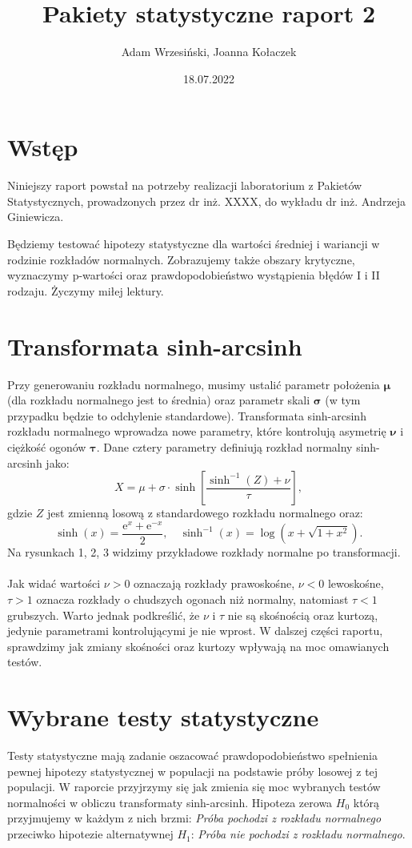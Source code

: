 \documentclass{article}
\title{Pakiety statystyczne raport 2}
\author{Adam Wrzesiński, Joanna Kołaczek}
\date{18.07.2022}
\theoremstyle{break}
\newcommand*{\e}{\mathrm{e}}
\begin{document}
	\maketitle
	\tableofcontents
	\clearpage
	\section*{Wstęp}
	
	Niniejszy raport powstał na potrzeby realizacji laboratorium z Pakietów Statystycznych, prowadzonych przez dr inż. XXXX, do wykładu dr inż. Andrzeja Giniewicza. 
	
	Będziemy testować hipotezy statystyczne dla wartości średniej i wariancji w rodzinie rozkładów normalnych. Zobrazujemy także obszary krytyczne, wyznaczymy p-wartości oraz prawdopodobieństwo wystąpienia błędów I i II rodzaju. Życzymy miłej lektury.
	
	\section*{Transformata sinh-arcsinh}
	Przy generowaniu rozkładu normalnego, musimy ustalić parametr położenia $\mathbf{\mu}$ (dla rozkładu normalnego jest to średnia) oraz parametr skali $\mathbf{\sigma}$ (w tym przypadku będzie to odchylenie standardowe). Transformata sinh-arcsinh rozkładu normalnego wprowadza nowe parametry, które kontrolują asymetrię $\mathbf{\nu}$ i ciężkość ogonów $\mathbf{\tau}$. Dane cztery parametry definiują rozkład normalny sinh-arcsinh jako:
	$$X = \mu + \sigma \cdot \sinh \left[ \frac{\sinh^{-1}(Z)+\nu}{\tau}\right],$$
	gdzie $Z$ jest zmienną losową z standardowego rozkładu normalnego oraz:
	$$\sinh(x) = \frac{\e^x + \e^{-x}}{2}, \quad \sinh^{-1}(x) = \log(x+\sqrt{1+x^2}).$$
	Na rysunkach 1, 2, 3 widzimy przykładowe rozkłady normalne po transformacji.
	\\ \\
	Jak widać wartości $\nu > 0$ oznaczają rozkłady prawoskośne, $\nu < 0$ lewoskośne, $\tau > 1$ oznacza rozkłady o chudszych ogonach niż normalny, natomiast $\tau < 1$ grubszych. Warto jednak podkreślić, że $\nu$ i $\tau$ nie są skośnością oraz kurtozą, jedynie parametrami kontrolującymi je nie wprost.
	W dalszej części raportu, sprawdzimy jak zmiany skośności oraz kurtozy wpływają na moc omawianych testów.
	
	\section*{Wybrane testy statystyczne}
	Testy statystyczne mają zadanie oszacować prawdopodobieństwo spełnienia pewnej hipotezy statystycznej w populacji na podstawie próby losowej z tej populacji. W raporcie przyjrzymy się jak zmienia się moc wybranych testów normalności w obliczu transformaty sinh-arcsinh. Hipoteza zerowa $H_0$ którą przyjmujemy w każdym z nich brzmi: \textit{Próba pochodzi z rozkładu normalnego} przeciwko  hipotezie alternatywnej $H_1$: \textit{Próba nie pochodzi z rozkładu normalnego}.
\end{document}
